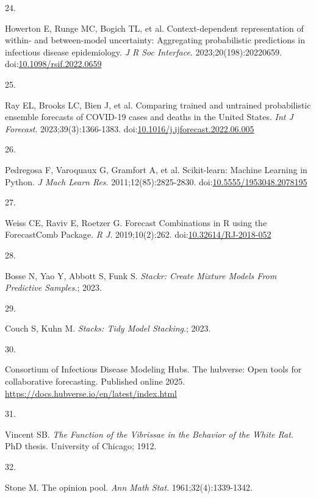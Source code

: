 \documentclass[
]{article}
\newlength{\cslhangindent}
\newlength{\csllabelwidth}
\newenvironment{CSLReferences}[2] %
 {\begin{list}{}{%
  \setlength{\itemindent}{0pt}
  \setlength{\leftmargin}{0pt}
  \setlength{\parsep}{0pt}
  \ifodd #1
   \setlength{\leftmargin}{\cslhangindent}
   \setlength{\itemindent}{-1\cslhangindent}
  \fi
  \setlength{\itemsep}{#2\baselineskip}}}
 {\end{list}}
\newcommand{\CSLLeftMargin}[1]{\parbox[t]{\csllabelwidth}{\strut#1\strut}}
\newcommand{\CSLRightInline}[1]{\parbox[t]{\linewidth - \csllabelwidth}{\strut#1\strut}}
\begin{document}
\begin{CSLReferences}{0}{1}
\CSLLeftMargin{24. }%
\CSLRightInline{Howerton E, Runge MC, Bogich TL, et al.
Context-dependent representation of within- and between-model
uncertainty: Aggregating probabilistic predictions in infectious disease
epidemiology. \emph{J R Soc Interface}. 2023;20(198):20220659.
doi:\href{https://doi.org/10.1098/rsif.2022.0659}{10.1098/rsif.2022.0659}}

\CSLLeftMargin{25. }%
\CSLRightInline{Ray EL, Brooks LC, Bien J, et al. Comparing trained and
untrained probabilistic ensemble forecasts of {COVID}-19 cases and
deaths in the {United} {States}. \emph{Int J Forecast}.
2023;39(3):1366-1383.
doi:\href{https://doi.org/10.1016/j.ijforecast.2022.06.005}{10.1016/j.ijforecast.2022.06.005}}

\CSLLeftMargin{26. }%
\CSLRightInline{Pedregosa F, Varoquaux G, Gramfort A, et al.
Scikit-learn: {Machine} {Learning} in {Python}. \emph{J Mach Learn Res}.
2011;12(85):2825-2830.
doi:\href{https://doi.org/10.5555/1953048.2078195}{10.5555/1953048.2078195}}

\CSLLeftMargin{27. }%
\CSLRightInline{Weiss CE, Raviv E, Roetzer G. Forecast Combinations in R
using the ForecastComb Package. \emph{R J}. 2019;10(2):262.
doi:\href{https://doi.org/10.32614/RJ-2018-052}{10.32614/RJ-2018-052}}

\CSLLeftMargin{28. }%
\CSLRightInline{Bosse N, Yao Y, Abbott S, Funk S. \emph{Stackr: {Create}
{Mixture} {Models} {From} {Predictive} {Samples}}.; 2023.}

\CSLLeftMargin{29. }%
\CSLRightInline{Couch S, Kuhn M. \emph{Stacks: Tidy Model Stacking}.;
2023.}

\CSLLeftMargin{30. }%
\CSLRightInline{Consortium of Infectious Disease Modeling Hubs. The
hubverse: Open tools for collaborative forecasting. Published online
2025. \url{https://docs.hubverse.io/en/latest/index.html}}

\CSLLeftMargin{31. }%
\CSLRightInline{Vincent SB. \emph{The Function of the Vibrissae in the
Behavior of the White Rat.} PhD thesis. University of Chicago; 1912.}

\CSLLeftMargin{32. }%
\CSLRightInline{Stone M. The opinion pool. \emph{Ann Math Stat}.
1961;32(4):1339-1342.}


\end{CSLReferences}
\end{document}
